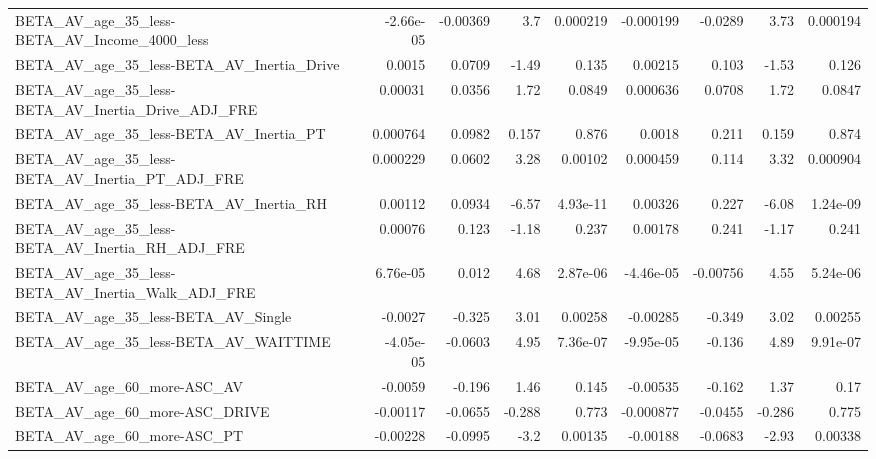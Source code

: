 \begin{tabular}{lrrrrrrrr}
BETA\_AV\_age\_35\_less-BETA\_AV\_Income\_4000\_less       &   -2.66e-05 &     -0.00369 &      3.7 & 0.000219 &  -0.000199 &     -0.0289 &         3.73 &      0.000194 \\
BETA\_AV\_age\_35\_less-BETA\_AV\_Inertia\_Drive          &      0.0015 &       0.0709 &    -1.49 &    0.135 &    0.00215 &       0.103 &        -1.53 &         0.126 \\
BETA\_AV\_age\_35\_less-BETA\_AV\_Inertia\_Drive\_ADJ\_FRE  &     0.00031 &       0.0356 &     1.72 &   0.0849 &   0.000636 &      0.0708 &         1.72 &        0.0847 \\
BETA\_AV\_age\_35\_less-BETA\_AV\_Inertia\_PT             &    0.000764 &       0.0982 &    0.157 &    0.876 &     0.0018 &       0.211 &        0.159 &         0.874 \\
BETA\_AV\_age\_35\_less-BETA\_AV\_Inertia\_PT\_ADJ\_FRE     &    0.000229 &       0.0602 &     3.28 &  0.00102 &   0.000459 &       0.114 &         3.32 &      0.000904 \\
BETA\_AV\_age\_35\_less-BETA\_AV\_Inertia\_RH             &     0.00112 &       0.0934 &    -6.57 & 4.93e-11 &    0.00326 &       0.227 &        -6.08 &      1.24e-09 \\
BETA\_AV\_age\_35\_less-BETA\_AV\_Inertia\_RH\_ADJ\_FRE     &     0.00076 &        0.123 &    -1.18 &    0.237 &    0.00178 &       0.241 &        -1.17 &         0.241 \\
BETA\_AV\_age\_35\_less-BETA\_AV\_Inertia\_Walk\_ADJ\_FRE   &    6.76e-05 &        0.012 &     4.68 & 2.87e-06 &  -4.46e-05 &    -0.00756 &         4.55 &      5.24e-06 \\
BETA\_AV\_age\_35\_less-BETA\_AV\_Single                 &     -0.0027 &       -0.325 &     3.01 &  0.00258 &   -0.00285 &      -0.349 &         3.02 &       0.00255 \\
BETA\_AV\_age\_35\_less-BETA\_AV\_WAITTIME               &   -4.05e-05 &      -0.0603 &     4.95 & 7.36e-07 &  -9.95e-05 &      -0.136 &         4.89 &      9.91e-07 \\
BETA\_AV\_age\_60\_more-ASC\_AV                         &     -0.0059 &       -0.196 &     1.46 &    0.145 &   -0.00535 &      -0.162 &         1.37 &          0.17 \\
BETA\_AV\_age\_60\_more-ASC\_DRIVE                      &    -0.00117 &      -0.0655 &   -0.288 &    0.773 &  -0.000877 &     -0.0455 &       -0.286 &         0.775 \\
BETA\_AV\_age\_60\_more-ASC\_PT                         &    -0.00228 &      -0.0995 &     -3.2 &  0.00135 &   -0.00188 &     -0.0683 &        -2.93 &       0.00338 \\

\end{tabular}
